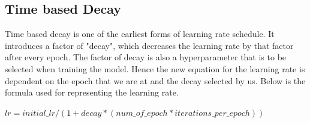 \subsection{Time based Decay}
Time based decay is one of the earliest forms of learning rate schedule. It introduces a factor of "decay", which decreases the learning rate by that factor after every epoch. The factor of decay is also a hyperparameter that is to be selected when training the model. Hence the new equation for the learning rate is dependent on the epoch that we are at and the decay selected by us. Below is the formula used for representing the learning rate.
\begin{center}
    \begin{math}
        lr = initial\_lr/(1+decay*(num\_of\_epoch*iterations\_per\_epoch))
    \end{math}
\end{center}

